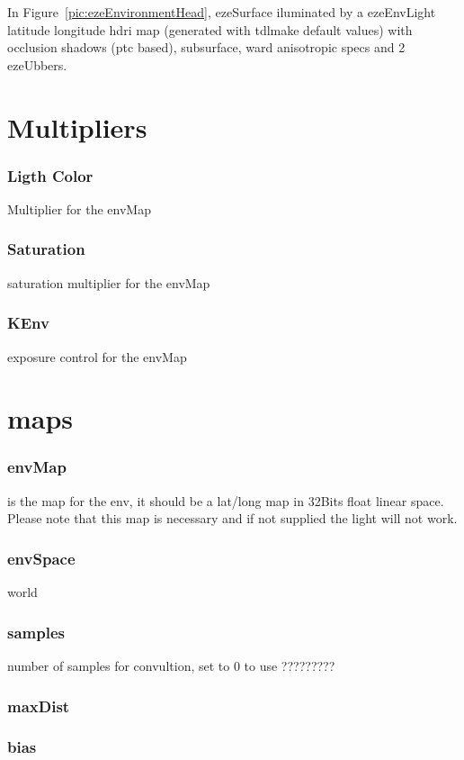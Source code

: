 \documentclass[final,letterpaper,twoside,12pt]{report}
\begin{document}
\noindent In Figure~{\ref{pic:ezeEnvironmentHead}}, ezeSurface iluminated by a ezeEnvLight latitude longitude hdri map (generated with tdlmake default values) with occlusion shadows (ptc based), subsurface, ward anisotropic specs and 2 ezeUbbers.

\section {Multipliers}
\subsubsection {Ligth Color}
Multiplier for the envMap 
\smallskip
\subsubsection {Saturation}
saturation multiplier for the envMap
\smallskip
\subsubsection {KEnv}
exposure control for the envMap
\smallskip
\section {maps}
\subsubsection {envMap}
is the map for the env, it should be a lat/long map in 32Bits float linear space.
Please note that this map is necessary and if not supplied the light will not work.
\smallskip
\subsubsection {envSpace}
world
\smallskip
\subsubsection {samples}
number of samples for convultion, set to 0 to use ?????????
\smallskip
\subsubsection {maxDist}

\smallskip
\subsubsection {bias}
\end{document}
